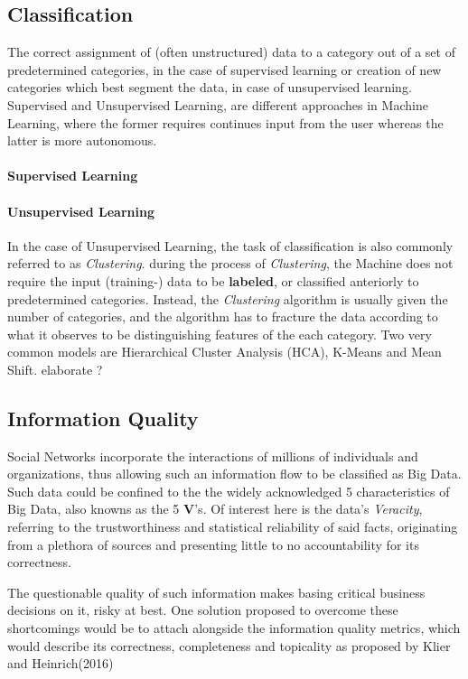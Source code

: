 	\subsection{Classification}
		The correct assignment of (often unstructured) data to a category out of a set of predetermined categories, in the case of supervised learning or creation of new categories which best segment the data, in case of unsupervised learning. Supervised and Unsupervised Learning, are different approaches in Machine Learning, where the former requires continues input from the user whereas the latter is more autonomous.
		
		\paragraph{Supervised Learning}
		
		\paragraph{Unsupervised Learning}
		In the case of Unsupervised Learning, the task of classification is also commonly referred to as \textit{Clustering}. during the process of \textit{Clustering}, the Machine does not require the input (training-) data to be \textbf{labeled}, or classified anteriorly to predetermined categories. Instead, the \textit{Clustering} algorithm is usually given the number of categories, and the algorithm has to fracture the data according to what it observes to be distinguishing features of the each category. Two very common models are Hierarchical Cluster Analysis (HCA), K-Means and Mean Shift. {\color{red} elaborate ?} 
		
		
		
	\subsection{Information Quality}
		Social Networks incorporate the interactions of millions of individuals and organizations, thus allowing such an information flow to be classified as Big Data. Such data could be confined to the the widely acknowledged 5 characteristics of Big Data, also knowns as the 5 \textbf{V}'s\cite{bigdata}. Of interest here is the data's \textit{Veracity}, referring to the trustworthiness and statistical reliability of said facts, originating from a plethora of sources and presenting little to no accountability for its correctness. 
		\par
		The questionable quality of such information makes basing critical business decisions on it, risky at best. One solution proposed to overcome these shortcomings would be to attach alongside the information quality metrics, which would describe its correctness, completeness and topicality as proposed by Klier and Heinrich(2016)\cite{klier2016datenqualitat}